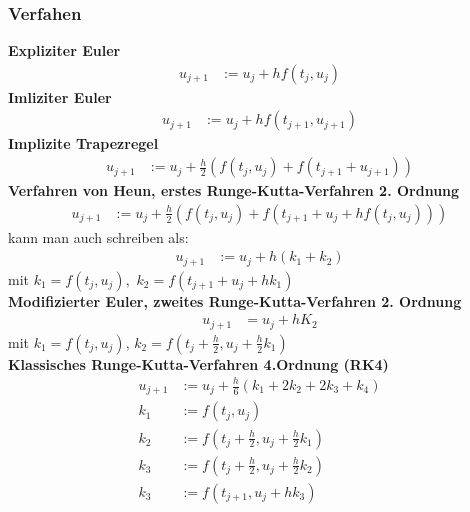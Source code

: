 \documentclass[
	ngerman,
	accentcolor=9c,%
	type=intern,
	marginpar=false
	]{tudapub}
\begin{document}
        \subsubsection{Verfahen}
            \textbf{Expliziter Euler}
            \begin{align*}
                u_{j+1} &:= u_j + hf(t_j,u_j)
            \end{align*}
            \textbf{Imliziter Euler}
            \begin{align*}
                u_{j+1} &:= u_j + hf(t_{j+1}, u_{j+1})
            \end{align*}
            \textbf{Implizite Trapezregel}
            \begin{align*}
                u_{j+1} &:= u_{j} + \frac{h}{2}(f(t_j,u_j)+f(t_{j+1}+u_{j+1}))
            \end{align*}
            \textbf{Verfahren von Heun, erstes Runge-Kutta-Verfahren 2. Ordnung}
            \begin{align*}
                u_{j+1} & := u_j + \frac{h}{2}(f(t_j, u_j) + f(t_{j+1} + u_j + hf(t_j, u_j))) 
            \end{align*}
            kann man auch schreiben als:
            \begin{align*}
                u_{j+1} &:= u_j + h (k_1 + k_2) 
            \end{align*}
            mit $k_1 = f(t_j, u_j),$  $k_2 = f(t_{j+1} + u_j + hk_1) $\\
            \textbf{Modifizierter Euler, zweites Runge-Kutta-Verfahren 2. Ordnung}
            \begin{align*}
                u_{j+1} &= u_j + hK_2
            \end{align*}
            mit $k_1 = f(t_j, u_j)$, $k_2 = f(t_j + \frac{h}{2}, u_j + \frac{h}{2}k_1)$\\
            \textbf{Klassisches Runge-Kutta-Verfahren  4.Ordnung (RK4)}
            \begin{align*}
                u_{j+1} &:= u_j + \frac{h}{6}(k_1 + 2k_2 + 2k_3 + k_4)\\
                k_1 &:= f(t_j, u_j)\\
                k_2 &:= f(t_j + \frac{h}{2}, u_j + \frac{h}{2}k_1)\\
                k_3 &:= f(t_j + \frac{h}{2}, u_j + \frac{h}{2}k_2)\\
                k_3 &:= f(t_{j+1}, u_j + hk_3)\\
            \end{align*}
\end{document}

